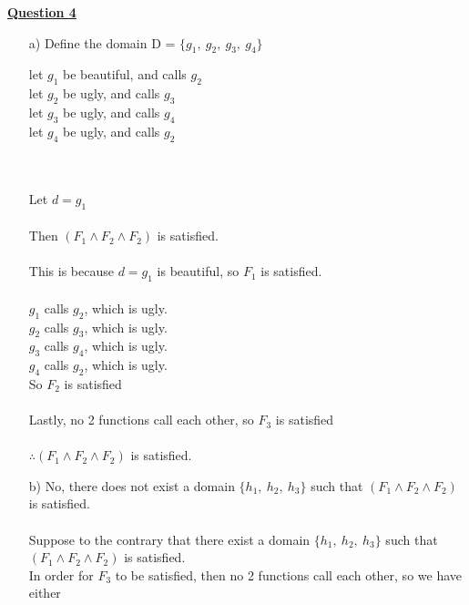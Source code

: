 \documentclass[12pt]{article}
\newenvironment{customPageLength}[3]{\noindent \eject \pdfpagewidth=#1 \pdfpageheight=#2 \newgeometry{margin=1in, left=0.6in, right=0.6in, bottom=#3}}{\restoregeometry \eject \pdfpagewidth=8.5in \pdfpageheight=11in}
\begin{document}
    

{\LARGE \noindent \underline{\textbf{Question 4}}}
\begin{itemize}[leftmargin=7mm]
    \item [a)] Define the domain D = $\{g_1,\ g_2,\ g_3,\ g_4\}$\\
    \vspace*{1mm}\hfill\begin{minipage}{\dimexpr\textwidth-16mm}
        let $g_1$ be beautiful, and calls $g_2$\\
        let $g_2$ be ugly, and calls $g_3$\\
        let $g_3$ be ugly, and calls $g_4$\\
        let $g_4$ be ugly, and calls $g_2$
    \end{minipage}
    \\\\
    Let $d = g_1$
    \\\\
    Then $(F_1 \wedge F_2 \wedge F_2)$ is satisfied.
    \\\\
    This is because $d=g_1$ is beautiful, so $F_1$ is satisfied.
    \\\\
    $g_1$ calls $g_2$, which is ugly.\\
    $g_2$ calls $g_3$, which is ugly.\\
    $g_3$ calls $g_4$, which is ugly.\\
    $g_4$ calls $g_2$, which is ugly.\\
    So $F_2$ is satisfied
    \\\\
    Lastly, no 2 functions call each other, so $F_3$ is satisfied
    \\\\
    $\therefore (F_1 \wedge F_2 \wedge F_2)$ is satisfied.
    \\[20mm]
    







\newpage
    \noindent 
    \item[b)] No, there does not exist a domain $\{h_1,\ h_2,\ h_3\}$ such that $(F_1 \wedge F_2 \wedge F_2)$ is satisfied.
    \\\\
    Suppose to the contrary that there exist a domain $\{h_1,\ h_2,\ h_3\}$ such that $(F_1 \wedge F_2 \wedge F_2)$ is satisfied.
    \\ In order for $F_3$ to be satisfied, then no 2 functions call each other, so we have either


\end{itemize}
\end{document}

